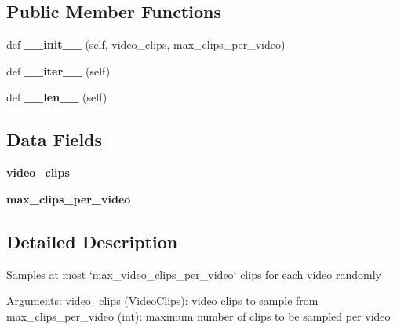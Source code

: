 \subsection*{Public Member Functions}
\begin{DoxyCompactItemize}
\item 
\mbox{\label{classtorchvision_1_1datasets_1_1samplers_1_1clip__sampler_1_1RandomClipSampler_a8d7e1b9b56f458b287cb0671a505d09f}} 
def {\bfseries \+\_\+\+\_\+init\+\_\+\+\_\+} (self, video\+\_\+clips, max\+\_\+clips\+\_\+per\+\_\+video)
\item 
\mbox{\label{classtorchvision_1_1datasets_1_1samplers_1_1clip__sampler_1_1RandomClipSampler_aa056522b9c4fddd62b9666b874a647cf}} 
def {\bfseries \+\_\+\+\_\+iter\+\_\+\+\_\+} (self)
\item 
\mbox{\label{classtorchvision_1_1datasets_1_1samplers_1_1clip__sampler_1_1RandomClipSampler_a9b5f8c6dd4feaf3b64bd0425a0993b98}} 
def {\bfseries \+\_\+\+\_\+len\+\_\+\+\_\+} (self)
\end{DoxyCompactItemize}
\subsection*{Data Fields}
\begin{DoxyCompactItemize}
\item 
\mbox{\label{classtorchvision_1_1datasets_1_1samplers_1_1clip__sampler_1_1RandomClipSampler_a6131d7473de1b31d4e14aa7410b73a9b}} 
{\bfseries video\+\_\+clips}
\item 
\mbox{\label{classtorchvision_1_1datasets_1_1samplers_1_1clip__sampler_1_1RandomClipSampler_a077c98470cde8920ff7db2a4cb1ea1c7}} 
{\bfseries max\+\_\+clips\+\_\+per\+\_\+video}
\end{DoxyCompactItemize}


\subsection{Detailed Description}
\begin{DoxyVerb}Samples at most `max_video_clips_per_video` clips for each video randomly

Arguments:
    video_clips (VideoClips): video clips to sample from
    max_clips_per_video (int): maximum number of clips to be sampled per video
\end{DoxyVerb}
 

